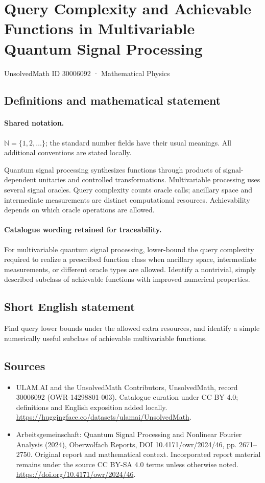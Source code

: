 \documentclass[11pt]{article}
\begin{document}
\setcounter{section}{30006091}
\section{Query Complexity and Achievable Functions in Multivariable Quantum Signal Processing}\label{30006092}
{\small UnsolvedMath ID 30006092 · Mathematical Physics}
\subsection{Definitions and mathematical statement}

\paragraph{Shared notation.}$\mathbb N=\{1,2,\ldots\}$; the standard number fields have their usual meanings. All additional conventions are stated locally.


Quantum signal processing synthesizes functions through products of signal-dependent unitaries and controlled transformations. Multivariable processing uses several signal oracles. Query complexity counts oracle calls; ancillary space and intermediate measurements are distinct computational resources. Achievability depends on which oracle operations are allowed.

\paragraph{Catalogue wording retained for traceability.}
For multivariable quantum signal processing, lower-bound the query complexity required to realize a prescribed function class when ancillary space, intermediate measurements, or different oracle types are allowed. Identify a nontrivial, simply described subclass of achievable functions with improved numerical properties.
\subsection{Short English statement}
Find query lower bounds under the allowed extra resources, and identify a simple numerically useful subclass of achievable multivariable functions.
\subsection{Sources}
\begin{itemize}
\item[\hypertarget{source:30006092:1}{S1}] ULAM.AI and the UnsolvedMath Contributors, UnsolvedMath, record 30006092 (OWR-14298801-003). Catalogue curation under CC BY 4.0; definitions and English exposition added locally.
\url{https://huggingface.co/datasets/ulamai/UnsolvedMath}.
\item[\hypertarget{source:30006092:2}{S2}] Arbeitsgemeinschaft: Quantum Signal Processing and Nonlinear Fourier Analysis (2024), Oberwolfach Reports, DOI 10.4171/owr/2024/46, pp. 2671--2750. Original report and mathematical context. Incorporated report material remains under the source CC BY-SA 4.0 terms unless otherwise noted.
\url{https://doi.org/10.4171/owr/2024/46}.
\end{itemize}
\label{end:30006092}
\end{document}
